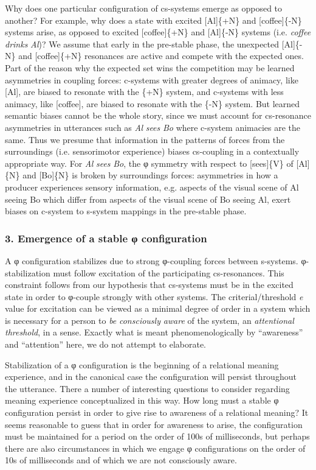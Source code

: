   Why does one particular configuration of cs-systems emerge as opposed to another? For example, why does a state with excited [Al]\{+N\} and [coffee]\{-N\} systems arise, as opposed to excited [coffee]\{+N\} and [Al]\{-N\} systems (i.e. \textit{coffee} \textit{drinks} \textit{Al})? We assume that early in the pre-stable phase, the unexpected [Al]\{-N\} and [coffee]\{+N\} resonances are active and compete with the expected ones. Part of the reason why the expected set wins the competition may be learned asymmetries in coupling forces: c-systems with greater degrees of animacy, like [Al], are biased to resonate with the \{+N\} system, and c-systems with less animacy, like [coffee], are biased to resonate with the \{-N\} system. But learned semantic biases cannot be the whole story, since we must account for cs-resonance asymmetries in utterances such as \textit{Al} \textit{sees} \textit{Bo} where c-system animacies are the same. Thus we presume that information in the patterns of forces from the surroundings (i.e. sensorimotor experience) biases cs-coupling in a contextually appropriate way. For \textit{Al} \textit{sees} \textit{Bo}, the φ symmetry with respect to [sees]\{V\} of [Al]\{N\} and [Bo]\{N\} is broken by surroundings forces: asymmetries in how a producer experiences sensory information, e.g. aspects of the visual scene of Al seeing Bo which differ from aspects of the visual scene of Bo seeing Al, exert biases on c-system to s-system mappings in the pre-stable phase.

\subsubsection{3. Emergence of a stable φ configuration}

A φ configuration stabilizes due to strong φ{}-coupling forces between s-systems. φ{}-stabilization must follow excitation of the participating cs-resonances. This constraint follows from our hypothesis that cs-systems must be in the excited state in order to φ-couple strongly with other systems. The criterial/threshold \textit{e} value for excitation can be viewed as a minimal degree of order in a system which is necessary for a person to \textit{be} \textit{consciously} \textit{aware} of the system, an \textit{attentional} \textit{threshold}, in a sense. Exactly what is meant phenomenologically by “awareness” and “attention” here, we do not attempt to elaborate. 

   Stabilization of a φ configuration is the beginning of a relational meaning experience, and in the canonical case the configuration will persist throughout the utterance. There a number of interesting questions to consider regarding meaning experience conceptualized in this way. How long must a stable φ configuration persist in order to give rise to awareness of a relational meaning? It seems reasonable to guess that in order for awareness to arise, the configuration must be maintained for a period on the order of 100s of milliseconds, but perhaps there are also circumstances in which we engage φ configurations on the order of 10s of milliseconds and of which we are not consciously aware.

